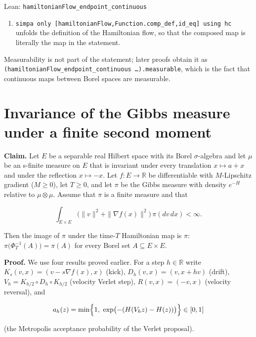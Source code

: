 \documentclass[11pt,a4paper]{article}
\begin{document}
\begin{leanbox}{Lean: \texttt{hamiltonianFlow\_\allowbreak{}endpoint\_\allowbreak{}continuous}}
\begin{enumerate}
\item \texttt{simpa only [hamiltonian\allowbreak{}Flow,Function.\allowbreak{}comp\_\allowbreak{}def,id\_\allowbreak{}eq] using hc} unfolds the definition of the Hamiltonian flow, so that the composed map is literally the map in the statement.

\end{enumerate}



Measurability is not part of the statement; later proofs obtain it as \texttt{(hamiltonian\allowbreak{}Flow\_\allowbreak{}endpoint\_\allowbreak{}continuous …).\allowbreak{}measurable}, which is the fact that continuous maps between Borel spaces are measurable.
\end{leanbox}

\section{\texorpdfstring{Invariance of the Gibbs measure under a finite second moment}{Invariance of the Gibbs measure under a finite second moment}}


\textbf{Claim.} Let \(E\) be a separable real Hilbert space with its Borel \(\sigma\)-algebra and let \(\mu\) be an s-finite measure on \(E\) that is invariant under every translation \(x\mapsto a+x\) and under the reflection \(x\mapsto-x\). Let \(f:E\to\mathbb R\) be differentiable with \(M\)-Lipschitz gradient (\(M\ge0\)), let \(T\ge0\), and let \(\pi\) be the Gibbs measure with density \(e^{-H}\) relative to \(\mu\otimes\mu\). Assume that \(\pi\) is a finite measure and that


\[\int_{E\times E}\bigl(\|v\|^2+\|\nabla f(x)\|^2\bigr)\,\pi(dv\,dx)<\infty .\]


Then the image of \(\pi\) under the time-\(T\) Hamiltonian map is \(\pi\): \(\pi\bigl(\Phi_T^{-1}(A)\bigr)=\pi(A)\) for every Borel set \(A\subseteq E\times E\).




\textbf{Proof.} We use four results proved earlier. For a step \(h\in\mathbb R\) write \(K_s(v,x)=(v-s\nabla f(x),x)\) (kick), \(D_h(v,x)=(v,x+hv)\) (drift), \(V_h=K_{h/2}\circ D_h\circ K_{h/2}\) (velocity Verlet step), \(R(v,x)=(-v,x)\) (velocity reversal), and


\[a_h(z)=\min\Bigl\{1,\ \exp\bigl(-(H(V_hz)-H(z))\bigr)\Bigr\}\in[0,1]\]


(the Metropolis acceptance probability of the Verlet proposal).
\end{document}
